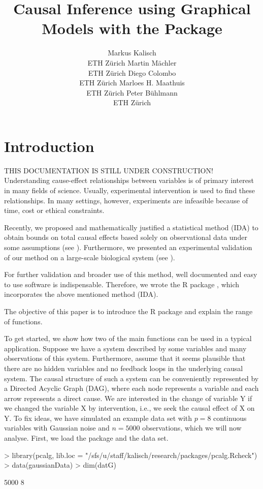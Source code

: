 \documentclass[article]{jss}
\author{Markus Kalisch\\ETH Z\"urich \And
        Martin M\"achler\\ETH Z\"urich \And
      Diego Colombo\\ETH Z\"urich \And
    Marloes H. Maathuis\\ETH Z\"urich \And
  Peter B\"uhlmann\\ETH Z\"urich}
\title{Causal Inference using Graphical Models with the Package \pkg{pcalg}}
\begin{document}

\section{Introduction}
THIS DOCUMENTATION IS STILL UNDER CONSTRUCTION! \\

Understanding cause-effect relationships between variables is of primary
interest in many fields of science. Usually, experimental intervention is
used to find these relationships. In many settings, however, experiments
are infeasible because of time, cost or ethical constraints.

Recently, we proposed and mathematically justified a statistical method
(IDA) to obtain bounds on total causal effects based solely on
observational data under some assumptions (see \cite{BuKaMa10}). Furthermore, we presented an
experimental validation of our method on a large-scale biological system
(see \cite{NatMethods10}).

For further validation and broader use of this method, well documented and
easy to use software is indispensable. Therefore, we wrote the R package
, which incorporates the above mentioned method (IDA).

The objective of this paper is to introduce the R package  and
explain the range of functions.

To get started, we show how two of the main functions can be used in a
typical application. Suppose we have a system described by some
variables and many observations of this system. Furthermore, assume
that it seems plausible that there are no hidden variables and no
feedback loops in the underlying causal system. The causal structure
of such a system can be conveniently represented by a Directed Acyclic
Graph (DAG), where each node represents a variable and each arrow
represents a direct cause. We are interested in the change of variable
Y if we changed the variable X by intervention, i.e., we seek the
causal effect of X on Y.  To fix ideas, we have simulated an example
data set with $p = 8$ continuous variables with Gaussian noise and $n
= 5000$ observations, which we will now analyse. First, we load the
package  and the data set.

\begin{Schunk}
\begin{Sinput}
>  library(pcalg, lib.loc = "/sfs/u/staff/kalisch/research/packages/pcalg.Rcheck")
>  data(gaussianData)
>  dim(datG)
\end{Sinput}
\begin{Soutput}
[1] 5000    8
\end{Soutput}
\end{Schunk}
\end{document}
